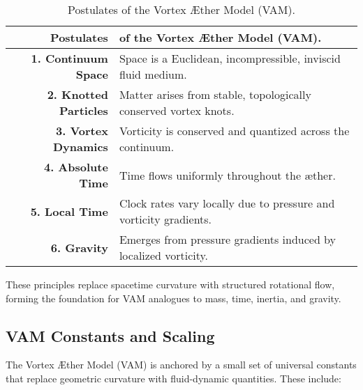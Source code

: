 \begin{table}[h!]
    \centering
    \begin{tabular}{rl}
        \toprule
        \hline
        \textbf{Postulates} & of the Vortex Æther Model (VAM).\\
        \hline
        \textbf{1. Continuum Space} & Space is a Euclidean, incompressible, inviscid fluid medium. \\
        \midrule
        \textbf{2. Knotted Particles} & Matter arises from stable, topologically conserved vortex knots. \\
        \midrule
        \textbf{3. Vortex Dynamics} & Vorticity is conserved and quantized across the continuum. \\
        \midrule
        \textbf{4. Absolute Time} & Time flows uniformly throughout the æther. \\
        \midrule
        \textbf{5. Local Time} & Clock rates vary locally due to pressure and vorticity gradients. \\
        \midrule
        \textbf{6. Gravity} & Emerges from pressure gradients induced by localized vorticity. \\
        \hline
        \bottomrule
    \end{tabular}
    \caption{Postulates of the Vortex Æther Model (VAM).\\}
    These principles replace spacetime curvature with structured rotational flow, \\
    forming the foundation for VAM analogues to mass, time, inertia, and gravity.
    \label{tab:postulates}
\end{table}


\subsection*{VAM Constants and Scaling}

The Vortex Æther Model (VAM) is anchored by a small set of universal constants that replace geometric curvature with fluid-dynamic quantities. These include:

